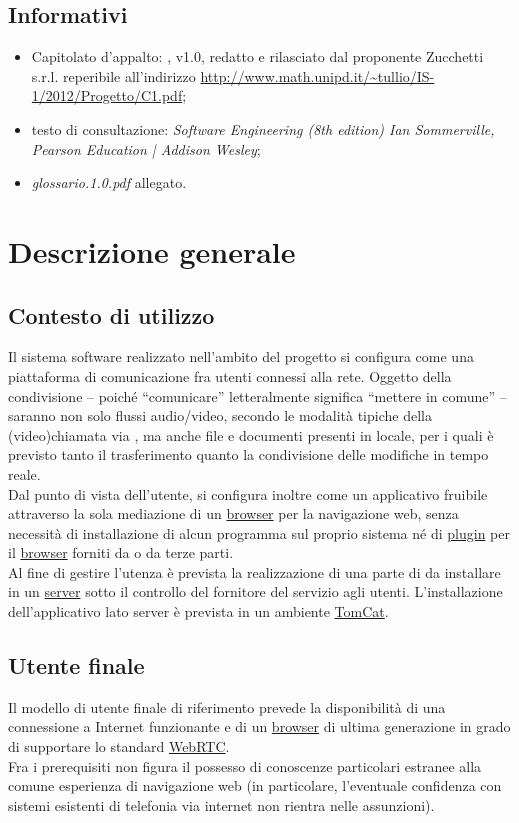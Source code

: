 \subsection{Informativi}
\begin{itemize}
\item[] Capitolato d'appalto: \caName{}, v1.0, redatto e rilasciato dal proponente Zucchetti s.r.l. reperibile all'indirizzo \url{http://www.math.unipd.it/~tullio/IS-1/2012/Progetto/C1.pdf};
\item[] testo di consultazione: \textit{Software Engineering (8th edition) Ian Sommerville, Pearson Education | Addison Wesley};
\item[] \textit{glossario.1.0.pdf} allegato.
\end{itemize}

\clearpage
\section{Descrizione generale}

\subsection{Contesto di utilizzo}
Il sistema software realizzato nell'ambito del progetto \caName{} si configura come una piattaforma di comunicazione fra utenti connessi alla rete. Oggetto della condivisione -- poiché ``comunicare'' letteralmente significa ``mettere in comune'' -- saranno non solo flussi audio/video, secondo le modalità tipiche della (video)chiamata via , ma anche file e documenti presenti in locale, per i quali è previsto tanto il trasferimento quanto la condivisione delle modifiche in tempo reale.\\
Dal punto di vista dell'utente, \caName{} si configura inoltre come un applicativo fruibile attraverso la sola mediazione di un \underline{browser} per la navigazione web, senza necessità di installazione di alcun programma  sul proprio sistema né di \underline{plugin} per il \underline{browser} forniti da \team{} o da terze parti.\\
Al fine di gestire l'utenza è prevista la realizzazione di una parte di  da installare in un \underline{server} sotto il controllo del fornitore del servizio agli utenti. L'installazione dell'applicativo lato {server} è prevista in un ambiente \underline{TomCat}.

\subsection{Utente finale}
Il modello di utente finale di riferimento prevede la disponibilità di una connessione a Internet funzionante e di un \underline{browser} di ultima generazione in grado di supportare lo standard \underline{WebRTC}.\\
Fra i prerequisiti non figura il possesso di conoscenze particolari estranee alla comune esperienza di navigazione web (in particolare, l'eventuale confidenza con sistemi esistenti di telefonia via internet non rientra nelle assunzioni).

